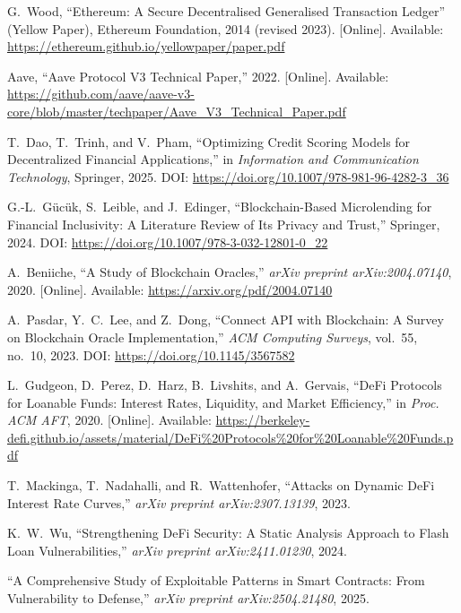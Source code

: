 \documentclass[12pt,a4paper]{report}
\begin{document}
{\begin{enumerate}[label={[\arabic*]}]
\item G.~Wood, ``Ethereum: A Secure Decentralised Generalised Transaction Ledger'' (Yellow Paper), Ethereum Foundation, 2014 (revised 2023). [Online]. Available: \url{https://ethereum.github.io/yellowpaper/paper.pdf}

\item Aave, ``Aave Protocol V3 Technical Paper,'' 2022. [Online]. Available: \url{https://github.com/aave/aave-v3-core/blob/master/techpaper/Aave_V3_Technical_Paper.pdf}

\item T.~Dao, T.~Trinh, and V.~Pham, ``Optimizing Credit Scoring Models for Decentralized Financial Applications,'' in \textit{Information and Communication Technology}, Springer, 2025. DOI: \url{https://doi.org/10.1007/978-981-96-4282-3_36}

\item G.-L.~G\"{u}c\"{u}k, S.~Leible, and J.~Edinger, ``Blockchain-Based Microlending for Financial Inclusivity: A Literature Review of Its Privacy and Trust,'' Springer, 2024. DOI: \url{https://doi.org/10.1007/978-3-032-12801-0_22}


\item A.~Beniiche, ``A Study of Blockchain Oracles,'' \textit{arXiv preprint arXiv:2004.07140}, 2020. [Online]. Available: \url{https://arxiv.org/pdf/2004.07140}

\item A.~Pasdar, Y.~C.~Lee, and Z.~Dong, ``Connect API with Blockchain: A Survey on Blockchain Oracle Implementation,'' \textit{ACM Computing Surveys}, vol.~55, no.~10, 2023. DOI: \url{https://doi.org/10.1145/3567582}

\item L.~Gudgeon, D.~Perez, D.~Harz, B.~Livshits, and A.~Gervais, ``DeFi Protocols for Loanable Funds: Interest Rates, Liquidity, and Market Efficiency,'' in \textit{Proc. ACM AFT}, 2020. [Online]. Available: \url{https://berkeley-defi.github.io/assets/material/DeFi\%20Protocols\%20for\%20Loanable\%20Funds.pdf}

\item T.~Mackinga, T.~Nadahalli, and R.~Wattenhofer, ``Attacks on Dynamic DeFi Interest Rate Curves,'' \textit{arXiv preprint arXiv:2307.13139}, 2023.

\item K.~W.~Wu, ``Strengthening DeFi Security: A Static Analysis Approach to Flash Loan Vulnerabilities,'' \textit{arXiv preprint arXiv:2411.01230}, 2024.

\item ``A Comprehensive Study of Exploitable Patterns in Smart Contracts: From Vulnerability to Defense,'' \textit{arXiv preprint arXiv:2504.21480}, 2025.


\end{enumerate}}
\end{document}
